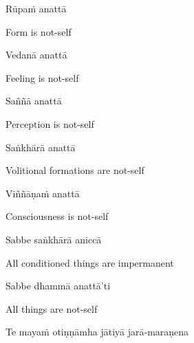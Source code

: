 Rūpaṁ anattā

\begin{english}
  Form is not-self
\end{english}

Vedanā anattā

\begin{english}
  Feeling is not-self
\end{english}

Saññā anattā

\begin{english}
  Perception is not-self
\end{english}

Saṅkhārā anattā

\begin{english}
  Volitional formations are not-self\hyperlink{endnote20-appendix}{\hypertarget{endnote20-body}{}}
\end{english}

Viññāṇaṁ anattā

\begin{english}
  Consciousness is not-self\hyperlink{endnote21-appendix}{\hypertarget{endnote21-body}{}}
\end{english}

Sabbe saṅkhārā aniccā

\begin{english}
  All conditioned things are impermanent\hyperlink{endnote22-appendix}{\hypertarget{endnote22-body}{}}
\end{english}

Sabbe dhammā anattā'ti

\begin{english}
  All things are not-self\hyperlink{endnote23-appendix}{\hypertarget{endnote23-body}{}}
\end{english}

Te mayaṁ otiṇṇāmha jātiyā jarā-maraṇena

